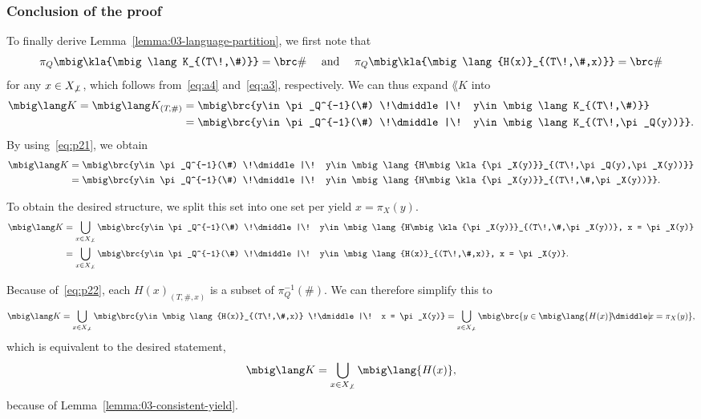 \subsubsection*{Conclusion of the proof}

To finally derive Lemma~\ref{lemma:03-language-partition}, we first note that
\begin{equation}\label{eq:p22}
 \pi_Q\mbig\kla{\mbig\lang K_{(T\!,\#)}} = \brc\#
 \quad\text{ and }\quad
 \pi_Q\mbig\kla{\mbig\lang{H(x)}_{(T\!,\#,x)}} = \brc\#
\end{equation}
for any $x\in X_{\not\bot}$, which follows from~\eqref{eq:a4} and~\eqref{eq:a3}, respectively.
We can thus expand $\lang K$ into
\begin{align*}
 \mbig\lang K
 = \mbig\lang K_{(T\!,\#)}
 &= \mbig\brc{y\in \pi_Q^{-1}(\#) \!\dmiddle|\! y\in\mbig\lang K_{(T\!,\#)}} \\
 &= \mbig\brc{y\in \pi_Q^{-1}(\#) \!\dmiddle|\! y\in\mbig\lang K_{(T\!,\pi_Q(y))}}.
\end{align*}
By using~\eqref{eq:p21}, we obtain
\begin{align*}
 \mbig\lang K
 &= \mbig\brc{y\in \pi_Q^{-1}(\#) \!\dmiddle|\! y\in\mbig\lang{H\mbig\kla{\pi_X(y)}}_{(T\!,\pi_Q(y),\pi_X(y))}} \\
 &= \mbig\brc{y\in \pi_Q^{-1}(\#) \!\dmiddle|\! y\in\mbig\lang{H\mbig\kla{\pi_X(y)}}_{(T\!,\#,\pi_X(y))}}.
\end{align*}

To obtain the desired structure, we split this set into one set per yield $x = \pi_X(y)$.
\begin{align*}
 \mbig\lang K
 &= \bigcup_{x\in X_{\not\bot}} \mbig\brc{y\in \pi_Q^{-1}(\#) \!\dmiddle|\! y\in\mbig\lang{H\mbig\kla{\pi_X(y)}}_{(T\!,\#,\pi_X(y))}, x = \pi_X(y)} \\
 &= \bigcup_{x\in X_{\not\bot}} \mbig\brc{y\in \pi_Q^{-1}(\#) \!\dmiddle|\! y\in\mbig\lang{H(x)}_{(T\!,\#,x)}, x = \pi_X(y)}.
\end{align*}

Because of~\eqref{eq:p22}, each $H(x)_{(T,\#,x)}$ is a subset of $\pi_Q^{-1}(\#)$. We can therefore simplify this to
\[
 \mbig\lang K
 = \bigcup_{x\in X_{\not\bot}} \mbig\brc{y\in \mbig\lang{H(x)}_{(T\!,\#,x)} \!\dmiddle|\! x = \pi_X(y)}
 = \bigcup_{x\in X_{\not\bot}} \mbig\brc{y\in \mbig\lang{H(x)} \!\dmiddle|\! x = \pi_X(y)},
\]
which is equivalent to the desired statement,
\[
 \mbig\lang K = \bigcup_{x\in X_{\not\bot}} \mbig\lang{H(x)},
\]
because of Lemma~\ref{lemma:03-consistent-yield}.
